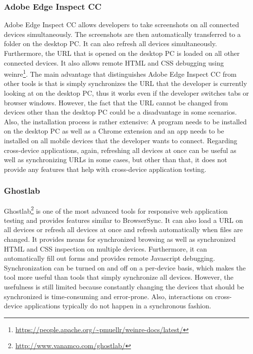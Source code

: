 \subsubsection{Adobe Edge Inspect CC}

Adobe Edge Inspect CC allows developers to take screenshots on all connected devices simultaneously. The screenshots are then automatically transferred to a folder on the desktop PC. It can also refresh all devices simultaneously. Furthermore, the URL that is opened on the desktop PC is loaded on all other connected devices. It also allows remote HTML and CSS debugging using weinre\footnote{\url{https://people.apache.org/~pmuellr/weinre-docs/latest/}}. The main advantage that distinguishes Adobe Edge Inspect CC from other tools is that is simply synchronizes the URL that the developer is currently looking at on the desktop PC, thus it works even if the developer switches tabs or browser windows. However, the fact that the URL cannot be changed from devices other than the desktop PC could be a disadvantage in some scenarios. Also, the installation process is rather extensive: A program needs to be installed on the desktop PC as well as a Chrome extension and an app needs to be installed on all mobile devices that the developer wants to connect. Regarding cross-device applications, again, refreshing all devices at once can be useful as well as synchronizing URLs in some cases, but other than that, it does not provide any features that help with cross-device application testing.

\subsubsection{Ghostlab}

Ghostlab\footnote{\url{http://www.vanamco.com/ghostlab/}} is one of the most advanced tools for responsive web application testing and provides features similar to BrowserSync. It can also load a URL on all devices or refresh all devices at once and refresh automatically when files are changed. It provides means for synchronized browsing as well as synchronized HTML and CSS inspection on multiple devices. Furthermore, it can automatically fill out forms and provides remote Javascript debugging. Synchronization can be turned on and off on a per-device basis, which makes the tool more useful than tools that simply synchronize all devices. However, the usefulness is still limited because constantly changing the devices that should be synchronized is time-consuming and error-prone. Also, interactions on cross-device applications typically do not happen in a synchronous fashion.

